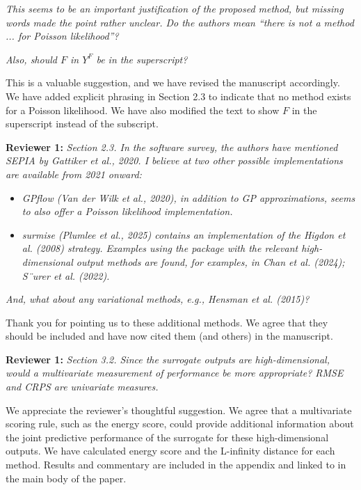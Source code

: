 \documentclass[12pt]{article}
\begin{document}
\bigskip
\noindent
\textit{This seems to be an important justification of the
proposed method, but missing words made the point rather unclear. Do the
authors mean ``there is not a method ... for Poisson likelihood''?}

\bigskip
\noindent
\textit{Also, should \(F\) in \(Y^F\) be in the superscript?}

\bigskip
\noindent
This is a valuable suggestion, and we have revised the manuscript accordingly.
We have added explicit phrasing in Section 2.3 to indicate that no method
exists for a Poisson likelihood. We have also modified the text to show $F$ in
the superscript instead of the subscript.

\bigskip
\noindent
\textbf{Reviewer 1:} \textit{Section 2.3. In the software survey, the authors
have mentioned SEPIA by Gattiker et al., 2020. I believe at two other possible
implementations are available from 2021 onward:}

\begin{itemize}
	\item \textit{GPflow (Van der Wilk et al., 2020), in addition to GP approximations, seems to also
offer a Poisson likelihood implementation.}
	\item \textit{surmise (Plumlee et al., 2025) contains an implementation of the Higdon et al. (2008)
strategy. Examples using the package with the relevant high-dimensional output
methods are found, for examples, in Chan et al. (2024); S¨urer et al.
(2022).}
\end{itemize}

\textit{And, what about any variational methods, e.g., Hensman et al. (2015)?}

\bigskip
\noindent
Thank you for pointing us to these additional methods. We agree that they
should be included and have now cited them (and others) in the manuscript.

\bigskip
\noindent
\textbf{Reviewer 1:} \textit{Section 3.2. Since the surrogate outputs are
high-dimensional, would a multivariate measurement of performance be more
appropriate? RMSE and CRPS are univariate measures.}

\bigskip
\noindent
We appreciate the reviewer’s thoughtful suggestion. We agree that a
multivariate scoring rule, such as the energy score, could provide additional
information about the joint predictive performance of the surrogate for these
high-dimensional outputs. We have calculated energy score and the L-infinity
distance for each method. Results and commentary are included in the appendix
and linked to in the main body of the paper.
\end{document}

